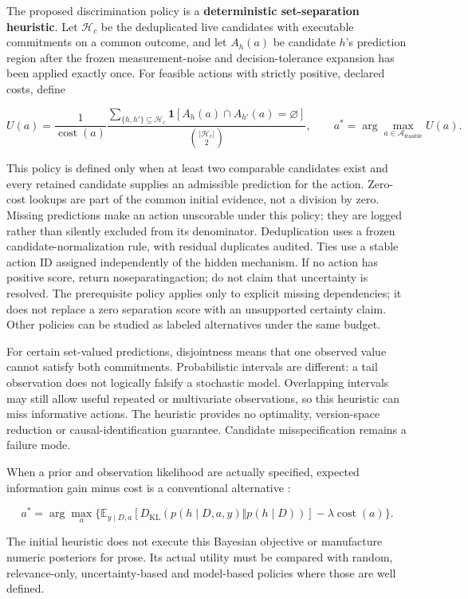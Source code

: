 \documentclass[11pt,a4paper]{article}
\newcommand{\CNSIdentifier}[1]{{\small\ttfamily\def\_{\textunderscore\allowbreak}#1}}
\begin{document}
The proposed discrimination policy is a \textbf{deterministic
set-separation heuristic}. Let \(\mathcal H_c\) be the deduplicated live
candidates with executable commitments on a common outcome, and let
\(A_h(a)\) be candidate \(h\)'s prediction region after the frozen
measurement-noise and decision-tolerance expansion has been applied
exactly once. For feasible actions with strictly positive, declared
costs, define

\[
U(a)=\frac{1}{\operatorname{cost}(a)}
\frac{\displaystyle\sum_{\{h,h'\}\subseteq\mathcal H_c}
\mathbf 1\!\left[A_h(a)\cap A_{h'}(a)=\varnothing\right]}
{\displaystyle\binom{|\mathcal H_c|}{2}},
\qquad a^*=\arg\max_{a\in\mathcal A_{\mathrm{feasible}}}U(a).
\]

This policy is defined only when at least two comparable candidates
exist and every retained candidate supplies an admissible prediction for
the action. Zero-cost lookups are part of the common initial evidence,
not a division by zero. Missing predictions make an action unscorable
under this policy; they are logged rather than silently excluded from
its denominator. Deduplication uses a frozen candidate-normalization
rule, with residual duplicates audited. Ties use a stable action ID
assigned independently of the hidden mechanism. If no action has
positive score, return \CNSIdentifier{no\_separating\_action}; do not claim
that uncertainty is resolved. The prerequisite policy applies only to
explicit missing dependencies; it does not replace a zero separation
score with an unsupported certainty claim. Other policies can be studied
as labeled alternatives under the same budget.

For certain set-valued predictions, disjointness means that one observed
value cannot satisfy both commitments. Probabilistic intervals are
different: a tail observation does not logically falsify a stochastic
model. Overlapping intervals may still allow useful repeated or
multivariate observations, so this heuristic can miss informative
actions. The heuristic provides no optimality, version-space reduction
or causal-identification guarantee. Candidate misspecification remains a
failure mode.

When a prior and observation likelihood are actually specified, expected
information gain minus cost is a conventional alternative \citep{R20}:

\[
a^*=\arg\max_a\{\mathbb E_{y\mid D,a}[D_{\mathrm{KL}}(p(h\mid D,a,y)\Vert p(h\mid D))]-\lambda\operatorname{cost}(a)\}.
\]

The initial heuristic does not execute this Bayesian objective or
manufacture numeric posteriors for prose. Its actual utility must be
compared with random, relevance-only, uncertainty-based and model-based
policies where those are well defined.
\end{document}

